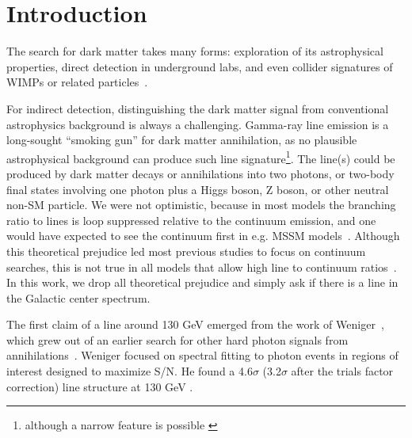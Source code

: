 \documentclass[aps,twocolumn,prd,superscriptaddress,showpacs,nofootinbib,fixfloat]{revtex4}
\begin{document}
\maketitle




\section{Introduction}

The search for dark matter takes many forms: exploration of
its astrophysical properties, direct detection in
underground labs, and even collider signatures of WIMPs or
related
particles~\citep{Jungman:1995df,Bergstrom:2000,Bertone:2005,
Hooper:2007Review, 2012arXiv1205.4882B}.

For indirect detection, distinguishing the dark matter
signal from conventional astrophysics background is always a
challenging. Gamma-ray line emission is a long-sought
``smoking gun'' for dark matter annihilation, as no
plausible astrophysical background can produce such line
signature\footnote{although a narrow feature is possible
\citep[see][]{2012arXiv1207.0458A}}.  The line(s) could be
produced by dark matter decays or annihilations into two
photons, or two-body final states involving one photon plus
a Higgs boson, Z boson, or other neutral non-SM particle. We
were not optimistic, because in most models the branching
ratio to lines is loop suppressed relative to the continuum
emission, and one would have expected to see the continuum
first in e.g. MSSM models~\citep[e.g.][]{Bergstrom:1997}.
Although this theoretical prejudice led most previous
studies to focus on continuum searches, this is not true in
all models that allow high line to continuum
ratios~\citep[e.g.][]{Bergstrom:1998, Bergstrom:2000,
Bertone:2009, Jackson:2010, Cline:2012, Weiner:2012}.  In
this work, we drop all theoretical prejudice and simply ask
if there is a line in the Galactic center spectrum.

The first claim of a line around 130 GeV emerged from the
work of Weniger~\citep{Weniger:2012}, which grew out of an
earlier search for other hard photon signals from
annihilations~\citep{Bringmann:2012}.  Weniger focused on
spectral fitting to photon events in regions of interest
designed to maximize S/N.  He found a 4.6$\sigma$
(3.2$\sigma$ after the trials factor correction) line
structure at 130 GeV .
\end{document}
